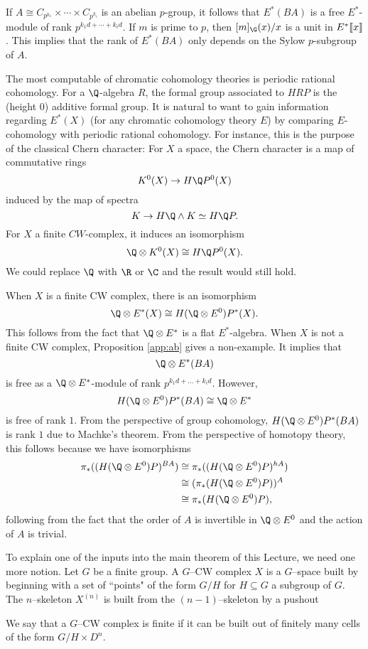 If $A \cong C_{p^{k_1}} \times \cdots \times C_{p^{k_i}}$ is an abelian $p$-group, it follows that $E^*(BA)$ is a free $E^*$-module of rank $p^{k_1d+\cdots + k_id}$. If $m$ is prime to $p$, then $[m]_{\G}(x)/x$ is a unit in $E^*\llbracket{x}\rrbracket$. This implies that the rank of $E^*(BA)$ only depends on the Sylow $p$-subgroup of $A$.

The most computable of chromatic cohomology theories is periodic rational cohomology. For a $\Q$-algebra $R$, the formal group associated to $HRP$ is the (height $0$) additive formal group. It is natural to want to gain information regarding $E^*(X)$ (for any chromatic cohomology theory $E$) by comparing $E$-cohomology with periodic rational cohomology. For instance, this is the purpose of the classical Chern character: For $X$ a space, the Chern character is a map of commutative rings
\[
K^0(X) \to H\Q P^0(X)
\] 
induced by the map of spectra \[K \to H\Q \wedge K \simeq H\Q P.\] For $X$ a finite $CW$-complex, it induces an isomorphism
\[
\Q \otimes K^0(X) \cong H\Q P^0(X).
\]
We could replace $\Q$ with $\R$ or $\C$ and the result would still hold.

When $X$ is a finite CW complex, there is an isomorphism
\begin{equation*}
\Q \otimes E^*(X) \cong H(\Q \otimes E^0)P^*(X).
\end{equation*}
This follows from the fact that $\Q \otimes E^*$ is a flat $E^*$-algebra. When $X$ is not a finite CW complex, Proposition \ref{app:ab} gives a non-example. It implies that
\[
\Q \otimes E^*(BA)
\]
is free as a $\Q \otimes E^*$-module of rank $p^{k_1d + \ldots + k_id}$. However, \[H(\Q \otimes E^0)P^*(BA) \cong \Q \otimes E^*\] is free of rank $1$. From the perspective of group cohomology, $H(\Q \otimes E^0)P^*(BA)$ is rank $1$ due to Machke's theorem. From the perspective of homotopy theory, this follows because we have isomorphisms
\begin{align*}
\pi_*((H(\Q \otimes E^0)P)^{BA}) &\cong \pi_*((H(\Q \otimes E^0)P)^{hA}) \\ &\cong (\pi_*(H(\Q \otimes E^0)P))^A \\ &\cong \pi_*(H(\Q \otimes E^0)P),
\end{align*}
following from the fact that the order of $A$ is invertible in $\Q \otimes E^0$ and the action of $A$ is trivial.

To explain one of the inputs into the main theorem of this Lecture, we need one more notion. Let $G$ be a finite group. A $G$--CW complex $X$ is a $G$--space built by beginning with a set of ``points" of the form $G/H$ for $H \subseteq G$ a subgroup of $G$. The $n$--skeleton $X^{(n)}$ is built from the $(n-1)$--skeleton by a pushout
\begin{center}
\end{center}
We say that a $G$--CW complex is finite if it can be built out of finitely many cells of the form $G/H \times D^n$.

